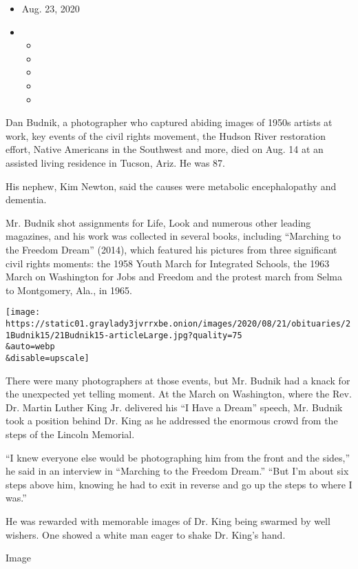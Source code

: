 \begin{itemize}
\item
  Aug. 23, 2020
\item
  \begin{itemize}
  \item
  \item
  \item
  \item
  \item
  \end{itemize}
\end{itemize}

Dan Budnik, a photographer who captured abiding images of 1950s artists
at work, key events of the civil rights movement, the Hudson River
restoration effort, Native Americans in the Southwest and more, died on
Aug. 14 at an assisted living residence in Tucson, Ariz. He was 87.

His nephew, Kim Newton, said the causes were metabolic encephalopathy
and dementia.

Mr. Budnik shot assignments for Life, Look and numerous other leading
magazines, and his work was collected in several books, including
``Marching to the Freedom Dream'' (2014), which featured his pictures
from three significant civil rights moments: the 1958 Youth March for
Integrated Schools, the 1963 March on Washington for Jobs and Freedom
and the protest march from Selma to Montgomery, Ala., in 1965.

\texttt{[image: https://static01.graylady3jvrrxbe.onion/images/2020/08/21/obituaries/21Budnik15/21Budnik15-articleLarge.jpg?quality=75\\\&auto=webp\\\&disable=upscale]}

There were many photographers at those events, but Mr. Budnik had a
knack for the unexpected yet telling moment. At the March on Washington,
where the Rev. Dr. Martin Luther King Jr. delivered his ``I Have a
Dream'' speech, Mr. Budnik took a position behind Dr. King as he
addressed the enormous crowd from the steps of the Lincoln Memorial.

``I knew everyone else would be photographing him from the front and the
sides,'' he said in an interview in ``Marching to the Freedom Dream.''
``But I'm about six steps above him, knowing he had to exit in reverse
and go up the steps to where I was.''

He was rewarded with memorable images of Dr. King being swarmed by well
wishers. One showed a white man eager to shake Dr. King's hand.

Image

